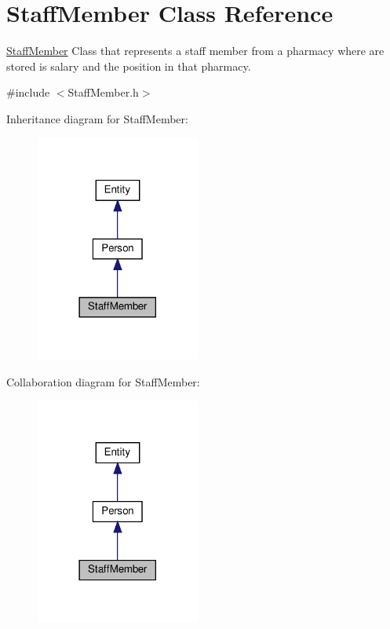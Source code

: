 \hypertarget{classStaffMember}{}\section{Staff\+Member Class Reference}
\label{classStaffMember}


\hyperlink{classStaffMember}{Staff\+Member} Class that represents a staff member from a pharmacy where are stored is salary and the position in that pharmacy.  




{\ttfamily \#include $<$Staff\+Member.\+h$>$}



Inheritance diagram for Staff\+Member\+:\nopagebreak
\begin{figure}[H]
\begin{center}
\leavevmode
\includegraphics[width=153pt]{classStaffMember__inherit__graph}
\end{center}
\end{figure}


Collaboration diagram for Staff\+Member\+:\nopagebreak
\begin{figure}[H]
\begin{center}
\leavevmode
\includegraphics[width=153pt]{classStaffMember__coll__graph}
\end{center}
\end{figure}

